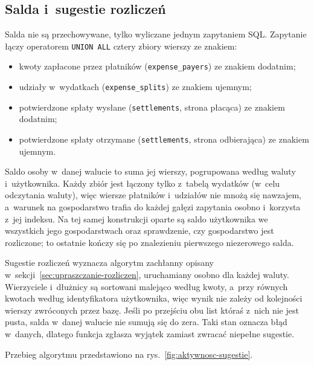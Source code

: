 \subsection{Salda i~sugestie rozliczeń}

Salda nie są przechowywane, tylko wyliczane jednym zapytaniem SQL. Zapytanie łączy operatorem \texttt{UNION ALL} cztery zbiory wierszy ze znakiem:

\begin{itemize}
  \item kwoty zapłacone przez płatników (\texttt{expense\_payers}) ze znakiem dodatnim;
  \item udziały w~wydatkach (\texttt{expense\_splits}) ze znakiem ujemnym;
  \item potwierdzone spłaty wysłane (\texttt{settlements}, strona płacąca) ze znakiem dodatnim;
  \item potwierdzone spłaty otrzymane (\texttt{settlements}, strona odbierająca) ze znakiem ujemnym.
\end{itemize}

Saldo osoby w~danej walucie to suma jej wierszy, pogrupowana według waluty i~użytkownika. Każdy zbiór jest łączony tylko z~tabelą wydatków (w~celu odczytania waluty), więc wiersze płatników i~udziałów nie mnożą się nawzajem, a~warunek na gospodarstwo trafia do każdej gałęzi zapytania osobno i~korzysta z~jej indeksu. Na tej samej konstrukcji oparte są saldo użytkownika we wszystkich jego gospodarstwach oraz sprawdzenie, czy gospodarstwo jest rozliczone; to ostatnie kończy się po znalezieniu pierwszego niezerowego salda.

Sugestie rozliczeń wyznacza algorytm zachłanny opisany w~sekcji~\ref{sec:upraszczanie-rozliczen}, uruchamiany osobno dla każdej waluty. Wierzyciele i~dłużnicy są sortowani malejąco według kwoty, a~przy równych kwotach według identyfikatora użytkownika, więc wynik nie zależy od kolejności wierszy zwróconych przez bazę. Jeśli po przejściu obu list któraś z~nich nie jest pusta, salda w~danej walucie nie sumują się do zera. Taki stan oznacza błąd w~danych, dlatego funkcja zgłasza wyjątek zamiast zwracać niepełne sugestie.

Przebieg algorytmu przedstawiono na rys.~\ref{fig:aktywnosc-sugestie}.

